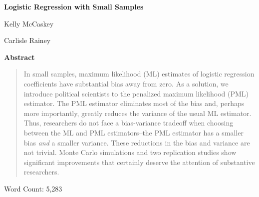 \documentclass[12pt]{article}
\begin{document}
\begin{center}
{\LARGE{\textbf{Logistic Regression with Small Samples}}}\\\vspace{2mm}

\vspace{10mm}

Kelly McCaskey

\vspace{3mm}

Carlisle Rainey
\end{center}

\vspace{10mm}

{\centerline{\textbf{Abstract}}}
\begin{quote}\noindent
In small samples, maximum likelihood (ML) estimates of logistic regression coefficients have substantial bias away from zero.
As a solution, we introduce political scientists to the penalized maximum likelihood (PML) estimator.
The PML estimator eliminates most of the bias and, perhaps more importantly, greatly reduces the variance of the usual ML estimator.
Thus, researchers do not face a bias-variance tradeoff when choosing between the ML and PML estimators--the PML estimator has a smaller bias \textit{and} a smaller variance.
These reductions in the bias and variance are not trivial. 
Monte Carlo simulations and two replication studies show significant improvements that certainly deserve the attention of substantive researchers.
 \end{quote}

 \vspace{5mm}
 \begin{center}
 Word Count: 5,283
 \end{center}
\end{document}
